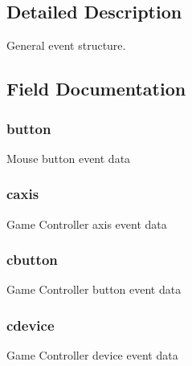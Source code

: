\begin{DoxyCompactItemize}
\end{DoxyCompactItemize}


\subsection{Detailed Description}
General event structure. 

\subsection{Field Documentation}
\subsubsection[{\texorpdfstring{button}{button}}]{ button}\hypertarget{union_s_d_l___event_a84c8b783a58353ba95917b1756af68d9}{}\label{union_s_d_l___event_a84c8b783a58353ba95917b1756af68d9}
Mouse button event data 
\subsubsection[{\texorpdfstring{caxis}{caxis}}]{ caxis}\hypertarget{union_s_d_l___event_af8486acab465238416da493c3cc9fc13}{}\label{union_s_d_l___event_af8486acab465238416da493c3cc9fc13}
Game Controller axis event data 
\subsubsection[{\texorpdfstring{cbutton}{cbutton}}]{ cbutton}\hypertarget{union_s_d_l___event_a3737e24bb0b43344c5c0c42a3bd164fa}{}\label{union_s_d_l___event_a3737e24bb0b43344c5c0c42a3bd164fa}
Game Controller button event data 
\subsubsection[{\texorpdfstring{cdevice}{cdevice}}]{ cdevice}\hypertarget{union_s_d_l___event_a03c83f444a0a9d6f2e7d86244f61e663}{}\label{union_s_d_l___event_a03c83f444a0a9d6f2e7d86244f61e663}
Game Controller device event data 
